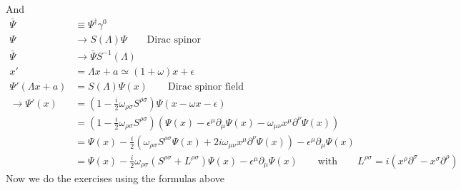 \documentclass[10pt,a4paper]{report}
\theoremstyle{definition}
\begin{document}
And
\begin{align}
\bar{\Psi}&\equiv\Psi^\dagger\gamma^0\\
\Psi&\rightarrow S(\Lambda)\Psi\qquad\text{Dirac spinor}\\
\bar{\Psi}&\rightarrow \bar{\Psi}S^{-1}(\Lambda)\\
x'&=\Lambda x+a\simeq (1+\omega)x+\epsilon\\
\Psi'(\Lambda x+a)
&=S(\Lambda)\Psi(x)\qquad\text{Dirac spinor field}\\
\rightarrow \Psi'(x)
&=\left(1-\frac{i}{2}\omega_{\rho\sigma} S^{\rho\sigma}\right)\Psi(x-\omega x-\epsilon)\\
&=\left(1-\frac{i}{2}\omega_{\rho\sigma} S^{\rho\sigma}\right)\left(\Psi(x)-\epsilon^\mu\partial_\mu\Psi(x)-\omega_{\mu\nu} x^\mu\partial^\nu\Psi(x)\right)\\
&=\Psi(x)-\frac{i}{2}\left(\omega_{\rho\sigma} S^{\rho\sigma}\Psi(x)+2i\omega_{\mu\nu}x^\mu\partial^\nu\Psi(x)\right)-\epsilon^\mu\partial_\mu\Psi(x)\\
&=\Psi(x)-\frac{i}{2}\omega_{\rho\sigma}\left(S^{\rho\sigma}+L^{\rho\sigma}\right)\Psi(x)-\epsilon^\mu\partial_\mu\Psi(x)\qquad\text{with}\qquad L^{\rho\sigma}=i(x^\rho\partial^\sigma-x^\sigma\partial^\rho)
\end{align}
Now we do the exercises using the formulas above
\end{document}
